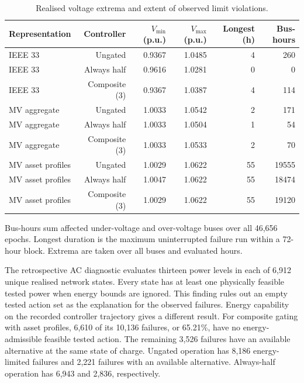 \documentclass[preprint,12pt]{elsarticle}
\begin{document}
\begin{table}[tbp]
\centering\small\setlength{\tabcolsep}{3.5pt}
\caption{Realised voltage extrema and extent of observed limit violations.}\label{tab:physical}
\begin{tabular}{lrrrrr}
\toprule
Representation & Controller & $V_{\min}$ (p.u.) & $V_{\max}$ (p.u.) & Longest (h) & Bus-hours\\\midrule
IEEE 33 & Ungated & 0.9367 & 1.0485 & 4 & 260\\
IEEE 33 & Always half & 0.9616 & 1.0281 & 0 & 0\\
IEEE 33 & Composite (3) & 0.9367 & 1.0387 & 4 & 114\\
MV aggregate & Ungated & 1.0033 & 1.0542 & 2 & 171\\
MV aggregate & Always half & 1.0033 & 1.0504 & 1 & 54\\
MV aggregate & Composite (3) & 1.0033 & 1.0533 & 2 & 70\\
MV asset profiles & Ungated & 1.0029 & 1.0622 & 55 & 19555\\
MV asset profiles & Always half & 1.0047 & 1.0622 & 55 & 18474\\
MV asset profiles & Composite (3) & 1.0029 & 1.0622 & 55 & 19120\\
\bottomrule\end{tabular}
\par\smallskip\parbox{\linewidth}{\footnotesize Bus-hours sum affected under-voltage and over-voltage buses over all 46,656 epochs. Longest duration is the maximum uninterrupted failure run within a 72-hour block. Extrema are taken over all buses and evaluated hours.}
\end{table}
The retrospective AC diagnostic evaluates thirteen power levels in each of 6,912 unique realised network states. Every state has at least one physically feasible tested power when energy bounds are ignored. This finding rules out an empty tested action set as the explanation for the observed failures. Energy capability on the recorded controller trajectory gives a different result. For composite gating with asset profiles, 6,610 of its 10,136 failures, or 65.21\%, have no energy-admissible feasible tested action. The remaining 3,526 failures have an available alternative at the same state of charge. Ungated operation has 8,186 energy-limited failures and 2,221 failures with an available alternative. Always-half operation has 6,943 and 2,836, respectively.
\end{document}
